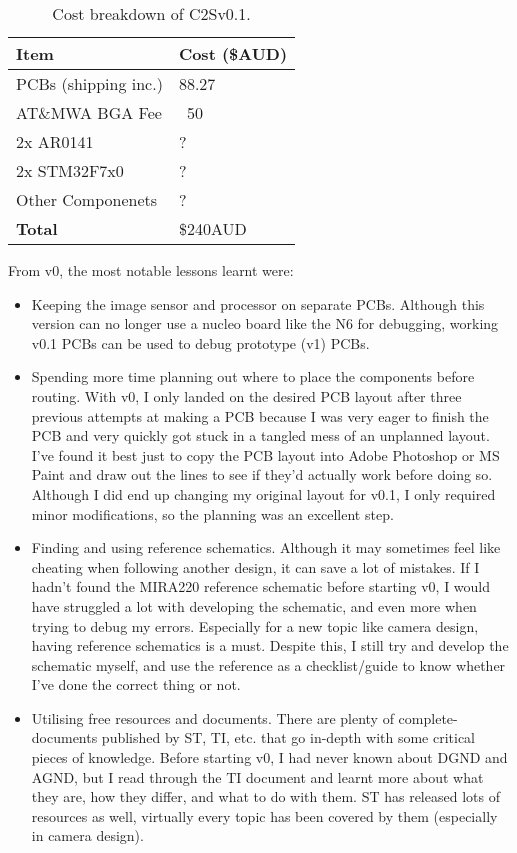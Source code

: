 \documentclass[10pt]{article}
\begin{document}
\begin{table}[H]
    \centering
    \begin{tabular}{|l|l|}
        \hline
        \textbf{Item} & \textbf{Cost (\$AUD)} \\
        \hline
        PCBs (shipping inc.) & 88.27 \\
        \hline
        AT\&MWA BGA Fee & ~50 \\
        \hline
        2x AR0141 & ? \\
        \hline
        2x STM32F7x0 & ? \\
        \hline
        Other Componenets & ? \\
        \hline
        \hline
        \textbf{Total} & \$240AUD \\
        \hline
    \end{tabular}
    \caption{Cost breakdown of C2Sv0.1.}
    \label{tab:c2sv0.1-costbreakdown}
\end{table}
From v0, the most notable lessons learnt were:
\begin{itemize}
    \item Keeping the image sensor and processor on separate PCBs. Although this version can no longer use a nucleo board like the N6 for debugging, working v0.1 PCBs can be used to debug prototype (v1) PCBs.
    \item Spending more time planning out where to place the components before routing. With v0, I only landed on the desired PCB layout after three previous attempts at making a PCB because I was very eager to finish the PCB and very quickly got stuck in a tangled mess of an unplanned layout.
    I've found it best just to copy the PCB layout into Adobe Photoshop or MS Paint and draw out the lines to see if they'd actually work before doing so. Although I did end up changing my original layout for v0.1, I only required minor modifications, so the planning was an excellent step.
    \item Finding and using reference schematics. Although it may sometimes feel like cheating when following another design, it can save a lot of mistakes. If I hadn't found the MIRA220 reference schematic before starting v0, I would have struggled a lot with developing the schematic, and even more when trying to debug my errors.
    Especially for a new topic like camera design, having reference schematics is a must. Despite this, I still try and develop the schematic myself, and use the reference as a checklist/guide to know whether I've done the correct thing or not.
    \item Utilising free resources and documents. There are plenty of complete-documents published by ST, TI, etc. that go in-depth with some critical pieces of knowledge. Before starting v0, I had never known about DGND and AGND, but I read through the TI document and learnt more about what they are, how they differ, and what to do with them.
    ST has released lots of resources as well, virtually every topic has been covered by them (especially in camera design).
\end{itemize}
\end{document}
